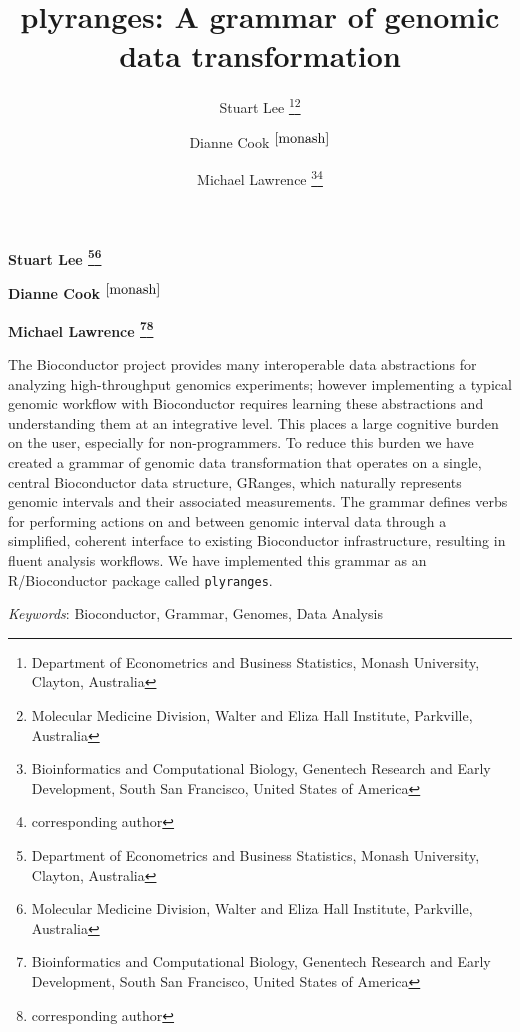 \documentclass[]{article}
\title{plyranges: A grammar of genomic data transformation  }
\author{\Large Stuart Lee
\footnote{\label{monash}Department of Econometrics and Business Statistics, Monash University, Clayton, Australia}\footnote{Molecular Medicine Division, Walter and Eliza Hall Institute, Parkville, Australia}\vspace{0.05in} \newline\normalsize\emph{}   \and \Large Dianne Cook \(^{\ref{monash}}\)\vspace{0.05in} \newline\normalsize\emph{}   \and \Large Michael Lawrence
\footnote{Bioinformatics and Computational Biology, Genentech Research and Early Development, South San Francisco, United States of America}\footnote{corresponding author}\vspace{0.05in} \newline\normalsize\emph{}  }
\date{}
\newcommand*{\authorfont}{\fontfamily{phv}\selectfont}
\renewenvironment{abstract}
 {{%
    \setlength{\leftmargin}{0mm}
    \setlength{\rightmargin}{\leftmargin}%
  }%
  \relax}
 {\endlist}
\begin{document}
	
%

{%
\setlength{\parindent}{0pt}
\thispagestyle{plain}
{\fontsize{18}{20}\selectfont\raggedright 
\maketitle  %

}

{
   \vskip 13.5pt\relax \normalsize\fontsize{11}{12} 
\textbf{\authorfont Stuart Lee
\footnote{\label{monash}Department of Econometrics and Business Statistics, Monash University, Clayton, Australia}\footnote{Molecular Medicine Division, Walter and Eliza Hall Institute, Parkville, Australia}} \hskip 15pt \emph{\small }   \par \textbf{\authorfont Dianne Cook \(^{\ref{monash}}\)} \hskip 15pt \emph{\small }   \par \textbf{\authorfont Michael Lawrence
\footnote{Bioinformatics and Computational Biology, Genentech Research and Early Development, South San Francisco, United States of America}\footnote{corresponding author}} \hskip 15pt \emph{\small }   

}

}








\begin{abstract}

    \hbox{\vrule height .2pt width 39.14pc}

    \vskip 8.5pt %

\noindent The Bioconductor project provides many interoperable data abstractions
for analyzing high-throughput genomics experiments; however implementing
a typical genomic workflow with Bioconductor requires learning these
abstractions and understanding them at an integrative level. This places
a large cognitive burden on the user, especially for non-programmers. To
reduce this burden we have created a grammar of genomic data
transformation that operates on a single, central Bioconductor data
structure, GRanges, which naturally represents genomic intervals and
their associated measurements. The grammar defines verbs for performing
actions on and between genomic interval data through a simplified,
coherent interface to existing Bioconductor infrastructure, resulting in
fluent analysis workflows. We have implemented this grammar as an
R/Bioconductor package called \texttt{plyranges}.


\vskip 8.5pt \noindent \emph{Keywords}: Bioconductor, Grammar, Genomes, Data Analysis \par

    \hbox{\vrule height .2pt width 39.14pc}



\end{abstract}
\end{document}
